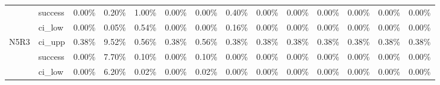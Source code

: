 \begin{tabular}{llrrrrrrrrrrrr}
     & success &       0.00\% & 0.20\% &  1.00\% &  0.00\% &  0.00\% &  0.40\% &        0.00\% & 0.00\% & 0.00\% & 0.00\% & 0.00\% & 0.00\% \\
     & ci\_low &       0.00\% & 0.05\% &  0.54\% &  0.00\% &  0.00\% &  0.16\% &        0.00\% & 0.00\% & 0.00\% & 0.00\% & 0.00\% & 0.00\% \\
N5R3 & ci\_upp &       0.38\% & 9.52\% &  0.56\% &  0.38\% &  0.56\% &  0.38\% &        0.38\% & 0.38\% & 0.38\% & 0.38\% & 0.38\% & 0.38\% \\
     & success &       0.00\% & 7.70\% &  0.10\% &  0.00\% &  0.10\% &  0.00\% &        0.00\% & 0.00\% & 0.00\% & 0.00\% & 0.00\% & 0.00\% \\
     & ci\_low &       0.00\% & 6.20\% &  0.02\% &  0.00\% &  0.02\% &  0.00\% &        0.00\% & 0.00\% & 0.00\% & 0.00\% & 0.00\% & 0.00\% \\
\bottomrule
\end{tabular}


